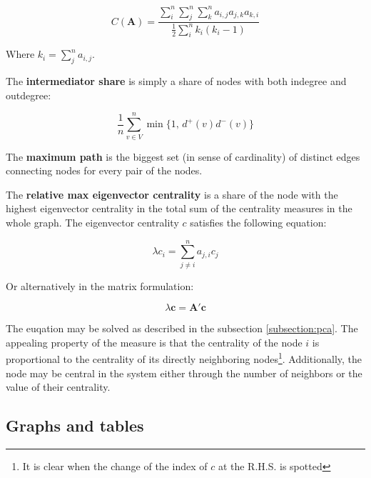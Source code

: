 \documentclass[12pt]{article}
\begin{document}
\begin{equation}
	C(\mathbf{A}) = \frac{\sum_{i}^{n} \sum_{j}^{n} \sum_{k}^{n} a_{i,j} a_{j,k} a_{k,i}}{\frac{1}{2} \sum_{i}^{n} k_i (k_i - 1)}
\end{equation}

Where $k_i = \sum_{j}^{n} a_{i,j}$. 

The \textbf{intermediator share} is simply a share of nodes with both indegree and outdegree:

\begin{equation}
	\frac{1}{n} \sum_{v \in V}^{n} \min\{1, \, d^{+}(v) d^{-}(v)\}
\end{equation}

The \textbf{maximum path} is the biggest set (in sense of cardinality) of distinct edges connecting nodes for every pair of the nodes. 

The \textbf{relative max eigenvector centrality} is a share of the node with the highest eigenvector centrality in the total sum of the centrality measures in the whole graph. The eigenvector centrality $c$ satisfies the following equation:

\begin{equation}
	\lambda c_i = \sum_{j \neq i}^{n} a_{j,i} c_j
\end{equation}

Or alternatively in the matrix formulation:

\begin{equation}
	\lambda \mathbf{c} = \mathbf{A}' \mathbf{c}
\end{equation}

The euqation may be solved as described in the subsection \ref{subsection:pca}. The appealing property of the measure is that the centrality of the node $i$ is proportional to the centrality of its directly neighboring nodes\footnote{It is clear when the change of the index of $c$ at the R.H.S. is spotted}. Additionally, the node may be central in the system either through the number of neighbors or the value of their centrality.

\subsection{Graphs and tables}\label{appendix:graphs_tables}
\end{document}
